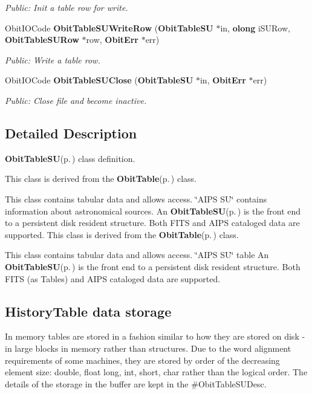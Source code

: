 \begin{CompactItemize}
\begin{CompactList}\small\item\em Public: Init a table row for write. \item\end{CompactList}\item 
Obit\-IOCode {\bf Obit\-Table\-SUWrite\-Row} ({\bf Obit\-Table\-SU} $\ast$in, {\bf olong} i\-SURow, {\bf Obit\-Table\-SURow} $\ast$row, {\bf Obit\-Err} $\ast$err)
\begin{CompactList}\small\item\em Public: Write a table row. \item\end{CompactList}\item 
Obit\-IOCode {\bf Obit\-Table\-SUClose} ({\bf Obit\-Table\-SU} $\ast$in, {\bf Obit\-Err} $\ast$err)
\begin{CompactList}\small\item\em Public: Close file and become inactive. \item\end{CompactList}\end{CompactItemize}


\subsection{Detailed Description}
{\bf Obit\-Table\-SU}{\rm (p.\,\pageref{structObitTableSU})} class definition. 

This class is derived from the {\bf Obit\-Table}{\rm (p.\,\pageref{structObitTable})} class.

This class contains tabular data and allows access. \char`\"{}AIPS SU\char`\"{} contains information about astronomical sources. An {\bf Obit\-Table\-SU}{\rm (p.\,\pageref{structObitTableSU})} is the front end to a persistent disk resident structure. Both FITS and AIPS cataloged data are supported. This class is derived from the {\bf Obit\-Table}{\rm (p.\,\pageref{structObitTable})} class.

This class contains tabular data and allows access. \char`\"{}AIPS SU\char`\"{} table An {\bf Obit\-Table\-SU}{\rm (p.\,\pageref{structObitTableSU})} is the front end to a persistent disk resident structure. Both FITS (as Tables) and AIPS cataloged data are supported.\subsection{History\-Table data storage}\label{ObitTableWX_8h_TableDataStorage}
In memory tables are stored in a fashion similar to how they are stored on disk - in large blocks in memory rather than structures. Due to the word alignment requirements of some machines, they are stored by order of the decreasing element size: double, float long, int, short, char rather than the logical order. The details of the storage in the buffer are kept in the \#Obit\-Table\-SUDesc.

